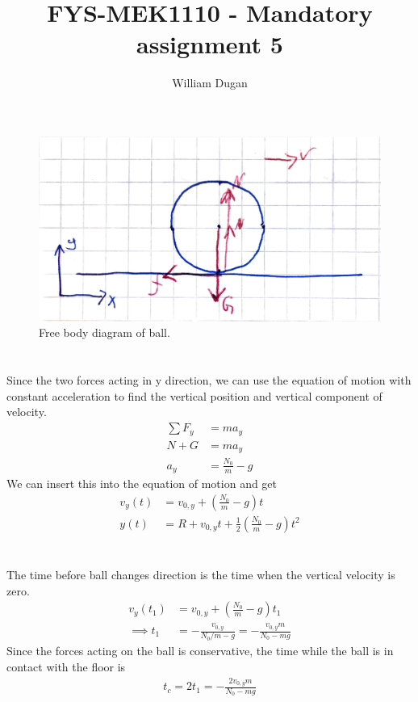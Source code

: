 \documentclass[a4paper,10pt,english]{article}
\title{FYS-MEK1110 - Mandatory assignment 5}
\author{William Dugan}
\begin{document}
\maketitle

\section{} \label{a}
\begin{figure}[h!]
	\centering
	\includegraphics[scale=0.5]{freebodydiagram.pdf}
	\caption{Free body diagram of ball.}
	\label{fig:freebodydiagram}
\end{figure}

\section{} \label{b}
Since the two forces acting in y direction, we can use the equation of motion with constant acceleration to find the vertical position and vertical component of velocity. 
\begin{align*}
	\sum F_y &= m a_y \\
	N + G &= m a_y \\
	a_y &= \frac{N_0}{m} - g
\end{align*}
We can insert this into the equation of motion and get
\begin{align}
	v_y (t) &= v_{0, y} + \left( \frac{N_0}{m} - g \right) t \\
	y (t) &= R + v_{0, y} t + \frac{1}{2} \left( \frac{N_0}{m} - g \right) t^2
\end{align}

\section{} \label{c}
The time before ball changes direction is the time when the vertical velocity is zero.
\begin{align*}
	v_y (t_1) &= v_{0, y} + \left( \frac{N_0}{m} - g \right) t_1 \\
	\implies t_1 &= -\frac{v_{0, y}}{N_0/m - g} = -\frac{v_{0, y} m}{N_0 - mg}
\end{align*}
Since the forces acting on the ball is conservative, the time while the ball is in contact with the floor is
\begin{align*}
	t_c = 2 t_1 = -\frac{2v_{0, y} m}{N_0 - mg}
\end{align*}
\end{document}
